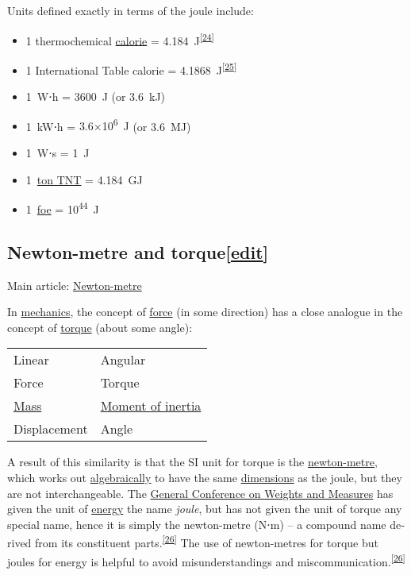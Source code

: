 \documentclass[
]{article}
\providecommand{\tightlist}{%
  \setlength{\itemsep}{0pt}\setlength{\parskip}{0pt}}
\newenvironment{LTR}{\beginL}{\endL}
\begin{document}
\begin{LTR}
\begin{otherlanguage}{english}
Units defined exactly in terms of the joule include:

\begin{itemize}
\tightlist
\item
  1 thermochemical \href{/wiki/Calorie}{calorie} =
  4.184{~}J\textsuperscript{\hyperref[cite_note-FAO-25]{{[}24{]}}}
\item
  1 International Table calorie =
  4.1868{~}J\textsuperscript{\hyperref[cite_note-26]{{[}25{]}}}
\item
  1{~}W⋅h = 3600{~}J (or 3.6{~}kJ)
\item
  1{~}kW⋅h = {{}3.6{×}10\textsuperscript{6}~J} (or 3.6{~}MJ)
\item
  1{~}W⋅s = {{}1~J}
\item
  1{~}\href{/wiki/Ton_TNT}{ton TNT} = {{}4.184~GJ}
\item
  1{~}\href{/wiki/Foe_(unit)}{foe} = {{}10\textsuperscript{44}~J}
\end{itemize}

\subsection[{{{[}}\href{/w/index.php?title=Joule&action=edit&section=6}{{edit}}{{]}}}]{\texorpdfstring{\label{Newton-metre_and_torque}{Newton-metre
and
torque}{{{[}}\href{/w/index.php?title=Joule&action=edit&section=6}{{edit}}{{]}}}}{Newton-metre and torque{[}edit{]}}}\label{newton-metre-and-torqueedit}

Main article: \href{/wiki/Newton-metre}{Newton-metre}

In \href{/wiki/Mechanics}{mechanics}, the concept of
\href{/wiki/Force}{force} (in some direction) has a close analogue in
the concept of \href{/wiki/Torque}{torque} (about some angle):

\begin{longtable}[]{@{}ll@{}}
\toprule\noalign{}
\endhead
\bottomrule\noalign{}
\endlastfoot
Linear & Angular \\
Force & Torque \\
\href{/wiki/Mass}{Mass} & \href{/wiki/Moment_of_inertia}{Moment of
inertia} \\
Displacement & Angle \\
\end{longtable}

A result of this similarity is that the SI unit for torque is the
\href{/wiki/Newton-metre}{newton-metre}, which works out
\href{/wiki/Algebra}{algebraically} to have the same
\href{/wiki/Dimensional_analysis}{dimensions} as the joule, but they are
not interchangeable. The
\href{/wiki/General_Conference_on_Weights_and_Measures}{General
Conference on Weights and Measures} has given the unit of
\href{/wiki/Energy}{energy} the name \emph{joule}, but has not given the
unit of torque any special name, hence it is simply the newton-metre
(N⋅m) -- a compound name derived from its constituent
parts.\textsuperscript{\hyperref[cite_note-BIPM2-27]{{[}26{]}}} The use
of newton-metres for torque but joules for energy is helpful to avoid
misunderstandings and
miscommunication.\textsuperscript{\hyperref[cite_note-BIPM2-27]{{[}26{]}}}


\end{otherlanguage}
\end{LTR}
\end{document}
